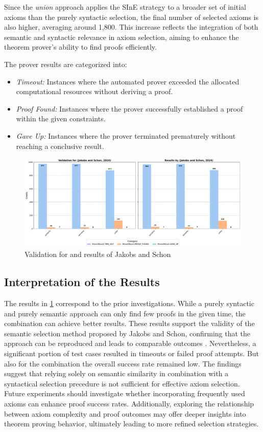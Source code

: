 \documentclass[english,version-2020-11]{uzl-thesis}
\begin{document}
Since the \textit{union} approach applies the SInE strategy to a broader set of initial axioms than the purely syntactic selection, the final number of selected axioms is also higher, averaging around 1,800. This increase reflects the integration of both semantic and syntactic relevance in axiom selection, aiming to enhance the theorem prover’s ability to find proofs efficiently.

The prover results are categorized into:
\begin{itemize}
    \item \textit{Timeout:} Instances where the automated prover exceeded the allocated computational resources without deriving a proof.
    \item \textit{Proof Found:} Instances where the prover successfully established a proof within the given constraints.
    \item \textit{Gave Up:} Instances where the prover terminated prematurely without reaching a conclusive result.
\end{itemize}

\begin{figure}[ht]
    \centering
    \includegraphics[width=\textwidth]{comparison_output.pdf}
    \caption{Validation for and results of Jakobs and Schon \cite{Schon2024}}
    \label{fig:reengineering}
\end{figure}

\subsection{Interpretation of the Results}

The results in \ref{fig:reengineering} correspond to the prior investigations. While a purely syntactic and purely semantic approach can only find few proofs in the given time, the combination can achieve better results.
These results support the validity of the semantic selection method proposed by Jakobs and Schon, confirming that the approach can be reproduced and leads to comparable outcomes \cite{Schon2024}.
Nevertheless, a significant portion of test cases resulted in timeouts or failed proof attempts. But also for the combination the overall success rate remained low.
The findings suggest that relying solely on semantic similarity in combination with a syntactical selection precedure is not sufficient for effective axiom selection. Future experiments should investigate whether incorporating frequently used axioms can enhance proof success rates. Additionally, exploring the relationship between axiom complexity and proof outcomes may offer deeper insights into theorem proving behavior, ultimately leading to more refined selection strategies.
\end{document}
